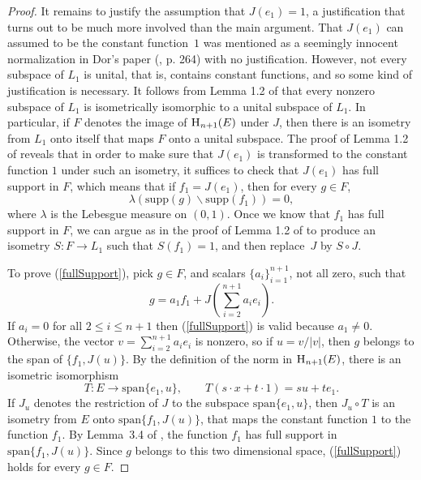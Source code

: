 \documentclass{article}[1100]
\theoremstyle{definition}
\theoremstyle{remark}
\newcommand\mySpace[2]{\textsc{H}_{#1}(#2)}
\begin{document}
\begin{proof}
\medskip

It remains to justify the assumption that  $J(e_1)=1$, a justification that turns out to be much more involved than the main argument.
That $J(e_1)$ can assumed to be the constant function~$1$ was mentioned as a seemingly innocent normalization in Dor's paper (\cite{Dor}, p. 264) with no justification. However, not every subspace of $L_1$ is unital, that is, contains constant functions, and so some kind of justification is necessary.  It follows from Lemma 1.2 of \cite{DJP} that every nonzero subspace of $L_1$ is isometrically isomorphic to a unital subspace of $L_1$. In particular, if $F$ denotes the image of $\mySpace{n+1}{E}$ under $J$, then 
there is an isometry from $L_1$ onto itself that maps $F$ onto a unital subspace. 
The proof of Lemma 1.2 of \cite{DJP} reveals that in order to make sure that $J(e_1)$ is transformed to the constant function $1$ under such an isometry,
it suffices to check that $J(e_1)$ has full support in $F$, which means that if $f_1=J(e_1)$, then for every $g\in F$, 
\begin{equation}\label{fullSupport}
\lambda(\text{supp}(g)\backslash\text{supp}(f_1))=0,
\end{equation}
where $\lambda$ is the Lebesgue measure on $(0,1)$. Once we know that $f_1$ has full support in $F$, we can argue as in the proof of Lemma 1.2 of \cite{DJP} to produce an isometry $S:F\to L_1$ such that $S(f_1)= 1$, and then replace~$J$ by $S\circ J$. 

\medskip

To prove (\ref{fullSupport}), pick  $g\in F$, and scalars $\{a_i\}_{i=1}^{n+1}$, not all zero, such that 
\[ g=a_1f_1+J(\sum_{i=2}^{n+1}a_ie_i). \]
If $a_i=0$ for all $2\leq i\leq n+1$ then  (\ref{fullSupport}) is valid because $a_1\neq 0$. Otherwise, the vector
$v=\sum_{i=2}^{n+1}a_ie_i$ is nonzero,  so if $u=v/|v|$, then $g$ belongs to the span of $\{f_1,J(u)\}$.
By the definition of the norm in $\mySpace{n+1}{E}$, 
there is an isometric isomorphism
\begin{equation}\label{twoDimIsometry}
T:E\to\text{span}\{e_1,u\},\qquad T(s\cdot x+t\cdot 1)=su+te_1.
\end{equation}
If $J_{u}$ denotes the restriction of $J$ to the subspace $\text{span}\{e_1,u\}$, then $J_{u}\circ T$ is an isometry from $E$ onto $\text{span}\{f_1,J(u)\}$, that maps the constant function $1$ to the function $f_1$. 
By Lemma~3.4 of \cite{Hardin}, the function $f_1$ has full support in 
$\text{span}\{f_1,J(u)\}$. Since $g$ belongs to this two dimensional space, (\ref{fullSupport}) holds for every $g\in F$.
\end{proof}
\end{document}
